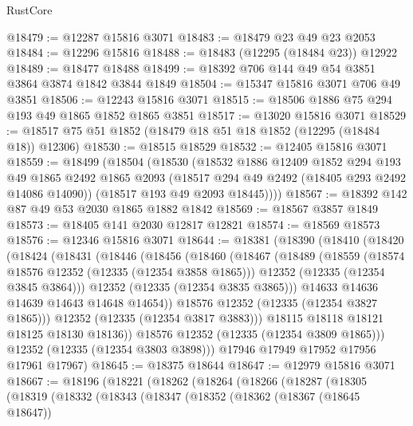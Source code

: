 \begin{lexlean}{RustCore}
\begin{coremodule}
@18479 := @12287 @15816 @3071
@18483 := @18479 @23 @49 @23 @2053
@18484 := @12296 @15816
@18488 := @18483 (@12295 (@18484 @23)) @12922
@18489 := @18477 @18488
@18499 := @18392 @706 @144 @49 @54 @3851 @3864 @3874 @1842 @3844 @1849
@18504 := @15347 @15816 @3071 @706 @49 @3851
@18506 := @12243 @15816 @3071
@18515 := @18506 @1886 @75 @294 @193 @49 @1865 @1852 @1865 @3851
@18517 := @13020 @15816 @3071
@18529 := @18517 @75 @51 @1852 (@18479 @18 @51 @18 @1852 (@12295 (@18484 @18)) @12306)
@18530 := @18515 @18529
@18532 := @12405 @15816 @3071
@18559 := @18499
    (@18504
      (@18530
        (@18532
          @1886
          @12409
          @1852
          @294
          @193
          @49
          @1865
          @2492
          @1865
          @2093
          (@18517 @294 @49 @2492 (@18405 @293 @2492 @14086 @14090))
          (@18517 @193 @49 @2093 @18445))))
@18567 := @18392 @142 @87 @49 @53 @2030 @1865 @1882 @1842
@18569 := @18567 @3857 @1849
@18573 := @18405 @141 @2030 @12817 @12821
@18574 := @18569 @18573
@18576 := @12346 @15816 @3071
@18644 := @18381
    (@18390
      (@18410
        (@18420
          (@18424
            (@18431
              (@18446
                (@18456
                  (@18460
                    (@18467
                      (@18489
                        (@18559
                          (@18574 @18576 @12352 (@12335 (@12354 @3858 @1865)))
                          @12352
                          (@12335 (@12354 @3845 @3864)))
                        @12352
                        (@12335 (@12354 @3835 @3865)))
                      @14633
                      @14636
                      @14639
                      @14643
                      @14648
                      @14654))
                  @18576
                  @12352
                  (@12335 (@12354 @3827 @1865)))
                @12352
                (@12335 (@12354 @3817 @3883)))
              @18115
              @18118
              @18121
              @18125
              @18130
              @18136))
          @18576
          @12352
          (@12335 (@12354 @3809 @1865)))
        @12352
        (@12335 (@12354 @3803 @3898)))
      @17946
      @17949
      @17952
      @17956
      @17961
      @17967)
@18645 := @18375 @18644
@18647 := @12979 @15816 @3071
@18667 := @18196
    (@18221
      (@18262
        (@18264
          (@18266
            (@18287
              (@18305
                (@18319
                  (@18332
                    (@18343
                      (@18347
                        (@18352
                          (@18362
                            (@18367 (@18645 @18647))

\end{coremodule}
\end{lexlean}
